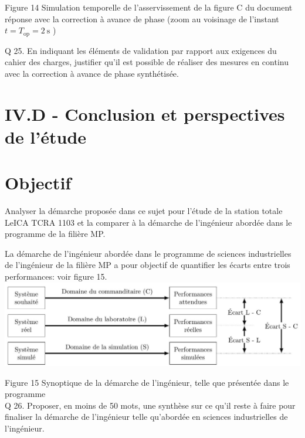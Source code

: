 \documentclass[10pt]{article}
\begin{document}
Figure 14 Simulation temporelle de l'asservissement de la figure C du document réponse avec la correction à avance de phase (zoom au voisinage de l'instant $t=T_{\mathrm{op}}=2 \mathrm{~s}$ )

Q 25. En indiquant les éléments de validation par rapport aux exigences du cahier des charges, justifier qu'il est possible de réaliser des mesures en continu avec la correction à avance de phase synthétisée.

\section*{IV.D - Conclusion et perspectives de l'étude}
\section*{Objectif}
Analyser la démarche proposée dans ce sujet pour l'étude de la station totale LeICA TCRA 1103 et la comparer à la démarche de l'ingénieur abordée dans le programme de la filière MP.

La démarche de l'ingénieur abordée dans le programme de sciences industrielles de l'ingénieur de la filière MP a pour objectif de quantifier les écarts entre trois performances: voir figure 15.\\
\includegraphics[max width=\textwidth, center]{2024_12_07_51b7f57c7f055c2d8d29g-11}

Figure 15 Synoptique de la démarche de l'ingénieur, telle que présentée dans le programme\\
Q 26. Proposer, en moins de 50 mots, une synthèse sur ce qu'il reste à faire pour finaliser la démarche de l'ingénieur telle qu'abordée en sciences industrielles de l'ingénieur.
\end{document}
